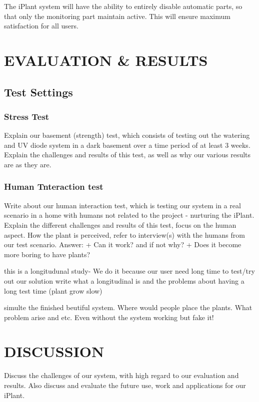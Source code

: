 \documentclass{ubicomp2012}
\begin{document}
The iPlant system will have the ability to entirely disable automatic parts, so that only the monitoring part maintain active. This will ensure maximum satisfaction for all users.



\section{EVALUATION \& RESULTS}
\subsection{Test Settings}
\subsubsection{Stress Test}
Explain our basement (strength) test, which consists of testing out the watering and UV diode system in a dark basement over a time period of at least 3 weeks.
Explain the challenges and results of this test, as well as why our various results are as they are.

\subsubsection{Human Tnteraction test}

Write about our human interaction test, which is testing our system in a real scenario in a home with humans not related to the project - nurturing the iPlant.
Explain the different challenges and results of this test, focus on the human aspect. How the plant is perceived, refer to interview(s) with the humans from our test scenario.
Answer:
+ Can it work? and if not why?
+ Does it become more boring to have plants?

 this is a longitudunal study- We do it because our user need long time to test/try out our solution
    write what a longitudinal is and the problems about having a long test time (plant grow slow)

simulte the finished beutiful system. Where would people place the plants. What problem arise and etc. Even without the system working but fake it!

\section{DISCUSSION}
Discuss the challenges of our system, with high regard to our evaluation and results. Also discuss and evaluate the future use, work and applications for our iPlant.
\end{document}
